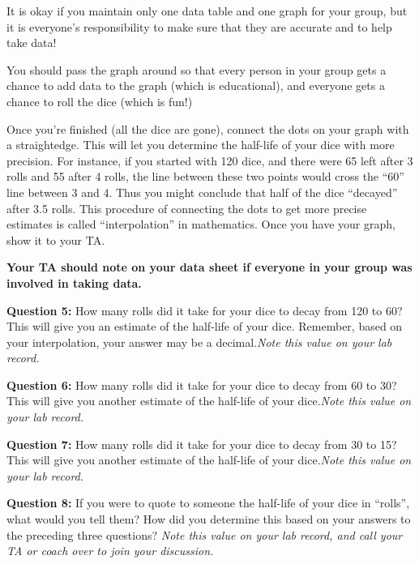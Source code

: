 \documentclass[11pt]{article}
\begin{document}
It is okay if you maintain only one data table and one graph for your group, but it is everyone's responsibility to make sure that they are accurate and to help take data!

You should pass the graph around so that every person in your group gets a chance to add data to the graph (which is educational), and everyone gets a chance to roll the dice (which is fun!)

Once you're finished (all the dice are gone), connect the dots on your graph with a straightedge. This will let you determine the half-life of your dice with more precision. For instance, if you started with 120 dice, and there were 65 left after 3 rolls and 55 after 4 rolls, the line between these two points would cross the ``60'' line between 3 and 4. Thus you might conclude that half of the dice ``decayed'' after 3.5 rolls. This procedure of connecting the dots to get more precise estimates is called ``interpolation'' in mathematics. Once you have your graph, show it to your TA.

{\bf Your TA should note on your data sheet if everyone in your group was involved in taking data.}



\vspace{3em}
{\bf Question 5:} How many rolls did it take for your dice to decay from 120 to 60? This will give you an estimate of the half-life of your dice. Remember, based on your interpolation, your answer may be a decimal.{\it Note this value on your lab record.}
\vspace{1em}

{\bf Question 6:} How many rolls did it take for your dice to decay from 60 to 30? This will give you another estimate of the half-life of your dice.{\it Note this value on your lab record.}


\vspace{1em}

{\bf Question 7:} How many rolls did it take for your dice to decay from 30 to 15? This will give you another estimate of the half-life of your dice.{\it Note this value on your lab record.}


\vspace{1em}

{\bf Question 8:} If you were to quote to someone the half-life of your dice in ``rolls'', what would you tell them? How did you determine this based on your answers to the preceding three questions? {\it Note this value on your lab record, and call your TA or coach over to join your discussion.}
\end{document}
